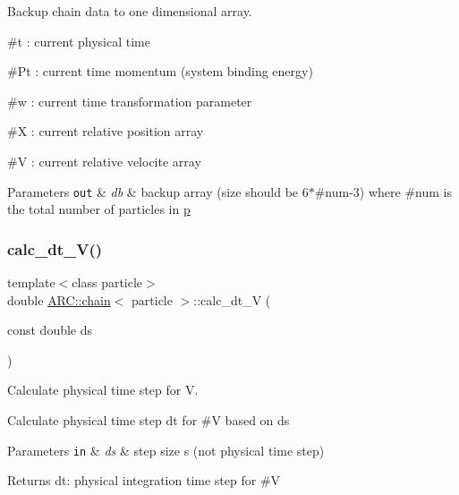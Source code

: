 Backup chain data to one dimensional array.
\begin{DoxyItemize}
\item \#t \+: current physical time
\item \#\+Pt \+: current time momentum (system binding energy)
\item \#w \+: current time transformation parameter
\item \#X \+: current relative position array
\item \#V \+: current relative velocite array 
\begin{DoxyParams}[1]{Parameters}
\mbox{\tt out}  & {\em db} & backup array (size should be 6$\ast$\#num-\/3) where \#num is the total number of particles in \hyperlink{classARC_1_1chain_af1793b656e139e1f87c2e0a55f87514b}{p} \\
\hline
\end{DoxyParams}

\end{DoxyItemize}\hypertarget{classARC_1_1chain_ad4bd36fa9cc967d0d32c3a5ca8074fa0}{}\label{classARC_1_1chain_ad4bd36fa9cc967d0d32c3a5ca8074fa0} 
\subsubsection{\texorpdfstring{calc\+\_\+dt\+\_\+\+V()}{calc\_dt\_V()}}
{\footnotesize\ttfamily template$<$class particle$>$ \\
double \hyperlink{classARC_1_1chain}{A\+R\+C\+::chain}$<$ particle $>$\+::calc\+\_\+dt\+\_\+V (\begin{DoxyParamCaption}\item[{const double}]{ds }\end{DoxyParamCaption})\hspace{0.3cm}{\ttfamily [inline]}}



Calculate physical time step for V. 

Calculate physical time step dt for \#V based on ds 
\begin{DoxyParams}[1]{Parameters}
\mbox{\tt in}  & {\em ds} & step size s (not physical time step) \\
\hline
\end{DoxyParams}
\begin{DoxyReturn}{Returns}
dt\+: physical integration time step for \#V 
\end{DoxyReturn}
\hypertarget{classARC_1_1chain_add21c686f37a3c0a7229bdce83015c61}{}\label{classARC_1_1chain_add21c686f37a3c0a7229bdce83015c61} 
